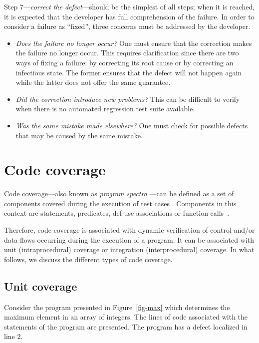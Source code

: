Step 7---\textit{correct the defect}---should be the simplest of all steps; when
it is reached, it is expected that the developer has full comprehension of the
failure. In order to consider a failure as ``fixed'', three concerns must be
addressed by the developer.
\begin{itemize}
  \item \textit{Does the failure no longer occur?} One must ensure that the
  correction makes the failure no longer occur. This requires
  clarification since there are two ways of fixing a failure: by correcting its
  root cause or by correcting an infectious state. The former ensures that
  the defect will not happen again while the latter does not offer the same
  guarantee.
  \item \textit{Did the correction introduce new problems?} This can be
  difficult to verify when there is no automated regression test suite available.
  \item \textit{Was the same mistake made elsewhere?} One must check for
  possible defects that may be caused by the same mistake.
\end{itemize}

\section{Code coverage}\label{sec:bg-codecoverage}
Code coverage---also known as \textit{program spectra}
\cite{renieris2003,harrold1998,dickinson2001}---can be defined as a set of
components covered during the execution of test cases \cite{elbaum2001}.
Components in this context are statements, predicates, def-use associations or
function calls~\cite{Abreu2008}.

Therefore, code coverage is associated with dynamic verification of control
and/or data flows occurring  during the execution of a program. It can be
associated with unit (intraprocedural) coverage or integration
(interprocedural) coverage. In what follows, we discuss the different types of
code coverage.

\subsection{Unit coverage}

Consider the program presented in Figure~\ref{fig-max}  which determines the
maximum element in an array of integers.  The lines of code  associated
with the statements of the program are presented. The program has a defect
localized in line 2.

